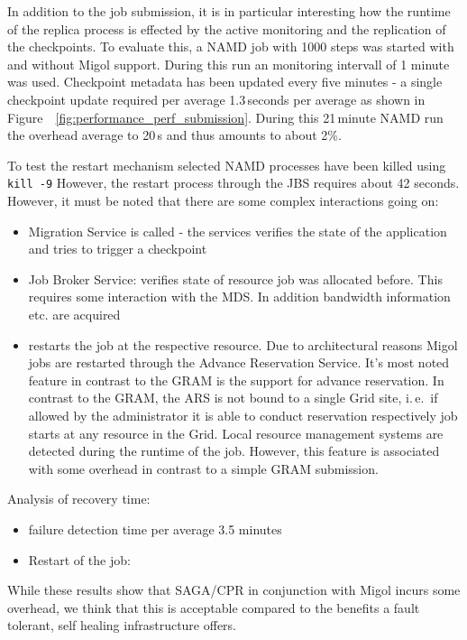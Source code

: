 \documentclass[times, 10pt,twocolumn]{article}
\begin{document}
In addition to the job submission, it is in particular interesting how the runtime of the replica process is effected by the active monitoring and the replication of the checkpoints. To evaluate this, a NAMD job with 1000 steps was started with and without Migol support. During this run an monitoring intervall of 1 minute was used. Checkpoint metadata has been updated every five minutes - a single checkpoint update required per average  1.3\,seconds per average as shown in Figure~~\ref{fig:performance_perf_submission}.  During this 21\,minute NAMD run the overhead average to 20\,s and thus amounts to about 2\%.


To test the restart mechanism selected NAMD processes have been killed using \texttt{kill -9}
However, the restart process through the JBS requires about 42 seconds. However, it must be noted that there are some complex interactions going on:
\begin{itemize}
    \item Migration Service is called - the services verifies the state of the application and tries to trigger a checkpoint
    \item Job Broker Service: verifies state of resource job was allocated before. This requires some interaction with the MDS. In addition bandwidth information etc. are acquired
    \item restarts the job at the respective resource. Due to architectural reasons Migol jobs are restarted through the Advance Reservation Service. It's most noted feature in contrast to the GRAM is the support for advance reservation. In contrast to the GRAM, the ARS is not bound to a single Grid site, i.\,e.\ if allowed by the administrator it is able to conduct reservation respectively job starts at any resource in the Grid. Local resource management systems are detected during the runtime of the job. However, this feature is associated with some overhead in contrast to a simple GRAM submission.
\end{itemize}

Analysis of recovery time:
\begin{itemize}
	\item failure detection time per average 3.5 minutes
	\item Restart of the job:
\end{itemize}        

While these results show that SAGA/CPR in conjunction with Migol incurs some 
overhead, we think that this is acceptable compared to the benefits a fault tolerant, 
self healing infrastructure offers.
\end{document}
